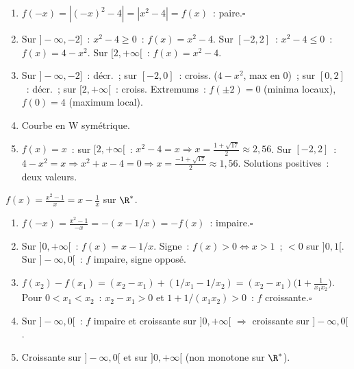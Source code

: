 
\begin{enumerate}
  \item $f(-x)=|(-x)^2-4|=|x^2-4|=f(x)$~: paire.\hfill$\square$
  \item Sur $]-\infty,-2]$~: $x^2-4\geq0$~: $f(x)=x^2-4$.
        Sur $[-2,2]$~: $x^2-4\leq0$~: $f(x)=4-x^2$.
        Sur $[2,+\infty[$~: $f(x)=x^2-4$.
  \item Sur $]-\infty,-2]$~: d\'ecr.~; sur $[-2,0]$~: croiss. ($4-x^2$, max en $0$)~;
        sur $[0,2]$~: d\'ecr.~; sur $[2,+\infty[$~: croiss.
        Extremums~: $f(\pm2)=0$ (minima locaux), $f(0)=4$ (maximum local).
  \item Courbe en W sym\'etrique.
  \item $f(x)=x$~: sur $[2,+\infty[$~: $x^2-4=x\Rightarrow x=\frac{1+\sqrt{17}}{2}\approx2{,}56$.\checkmark
        Sur $[-2,2]$~: $4-x^2=x\Rightarrow x^2+x-4=0\Rightarrow x=\frac{-1+\sqrt{17}}{2}\approx1{,}56$.
        Solutions positives~: deux valeurs.
\end{enumerate}


$f(x)=\frac{x^2-1}{x}=x-\frac{1}{x}$ sur $\R^*$.
\begin{enumerate}
  \item $f(-x)=\frac{x^2-1}{-x}=-(x-1/x)=-f(x)$~: impaire.\hfill$\square$
  \item Sur $]0,+\infty[$~: $f(x)=x-1/x$. Signe~: $f(x)>0\Leftrightarrow x>1$~; $<0$ sur $]0,1[$.
        Sur $]-\infty,0[$~: $f$ impaire, signe oppos\'e.
  \item $f(x_2)-f(x_1)=(x_2-x_1)+(1/x_1-1/x_2)=(x_2-x_1)\bigl(1+\frac{1}{x_1x_2}\bigr)$.
        Pour $0<x_1<x_2$~: $x_2-x_1>0$ et $1+1/(x_1x_2)>0$~: $f$ croissante.\hfill$\square$
  \item Sur $]-\infty,0[$~: $f$ impaire et croissante sur $]0,+\infty[$ $\Rightarrow$ croissante sur $]-\infty,0[$.
  \item Croissante sur $]-\infty,0[$ et sur $]0,+\infty[$ (non monotone sur $\R^*$).
\end{enumerate}


